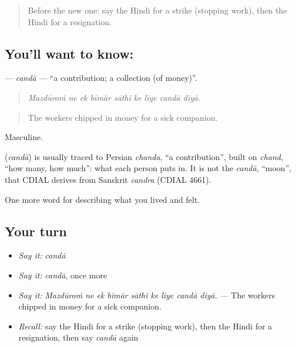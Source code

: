 \label{lesson:HI-C509-canda}



\begin{quote}
Before the new one: say the Hindi for a strike (stopping work), then the Hindi for a resignation.
\end{quote}

\subsection*{You'll want to know: }
\textbf{} — \emph{candā} — \textquotedblleft{}a contribution; a collection (of money)\textquotedblright{}.

\begin{quote}
        
\end{quote}

\begin{quote}
\emph{Mazdūroṁ ne ek bīmār sāthī ke liye candā diyā.}
\end{quote}

\begin{quote}
The workers chipped in money for a sick companion.
\end{quote}

Masculine.

\begin{cousinweb}
\textbf{} (\emph{candā}) is usually traced to Persian \emph{chanda}, \textquotedblleft{}a contribution\textquotedblright{}, built on \emph{chand}, \textquotedblleft{}how many, how much\textquotedblright{}: what each person puts in. It is not the \emph{candā}, \textquotedblleft{}moon\textquotedblright{}, that CDIAL derives from Sanskrit \emph{candra} (CDIAL 4661).
\end{cousinweb}

\begin{grammarlens}[title={What you've built}]
One more word for describing what you lived and felt.
\end{grammarlens}

\subsection*{Your turn}
\begin{itemize}
\raggedright
  \item \emph{Say it:} \emph{candā}
  \item \emph{Say it:} \emph{candā}, once more
  \item \emph{Say it:} \emph{Mazdūroṁ ne ek bīmār sāthī ke liye candā diyā.} — The workers chipped in money for a sick companion.
  \item \emph{Recall:} say the Hindi for a strike (stopping work), then the Hindi for a resignation, then say \emph{candā} again
\end{itemize}

